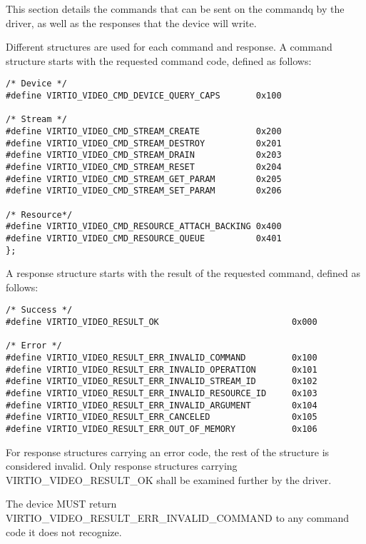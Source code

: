 This section details the commands that can be sent on the commandq by
the driver, as well as the responses that the device will write.

Different structures are used for each command and response. A command
structure starts with the requested command code, defined as follows:

\begin{lstlisting}
/* Device */
#define VIRTIO_VIDEO_CMD_DEVICE_QUERY_CAPS       0x100

/* Stream */
#define VIRTIO_VIDEO_CMD_STREAM_CREATE           0x200
#define VIRTIO_VIDEO_CMD_STREAM_DESTROY          0x201
#define VIRTIO_VIDEO_CMD_STREAM_DRAIN            0x203
#define VIRTIO_VIDEO_CMD_STREAM_RESET            0x204
#define VIRTIO_VIDEO_CMD_STREAM_GET_PARAM        0x205
#define VIRTIO_VIDEO_CMD_STREAM_SET_PARAM        0x206

/* Resource*/
#define VIRTIO_VIDEO_CMD_RESOURCE_ATTACH_BACKING 0x400
#define VIRTIO_VIDEO_CMD_RESOURCE_QUEUE          0x401
};
\end{lstlisting}

A response structure starts with the result of the requested command,
defined as follows:

\begin{lstlisting}
/* Success */
#define VIRTIO_VIDEO_RESULT_OK                          0x000

/* Error */
#define VIRTIO_VIDEO_RESULT_ERR_INVALID_COMMAND         0x100
#define VIRTIO_VIDEO_RESULT_ERR_INVALID_OPERATION       0x101
#define VIRTIO_VIDEO_RESULT_ERR_INVALID_STREAM_ID       0x102
#define VIRTIO_VIDEO_RESULT_ERR_INVALID_RESOURCE_ID     0x103
#define VIRTIO_VIDEO_RESULT_ERR_INVALID_ARGUMENT        0x104
#define VIRTIO_VIDEO_RESULT_ERR_CANCELED                0x105
#define VIRTIO_VIDEO_RESULT_ERR_OUT_OF_MEMORY           0x106
\end{lstlisting}

For response structures carrying an error code, the rest of the
structure is considered invalid. Only response structures carrying
VIRTIO_VIDEO_RESULT_OK shall be examined further by the driver.


The device MUST return VIRTIO_VIDEO_RESULT_ERR_INVALID_COMMAND to
any command code it does not recognize.

